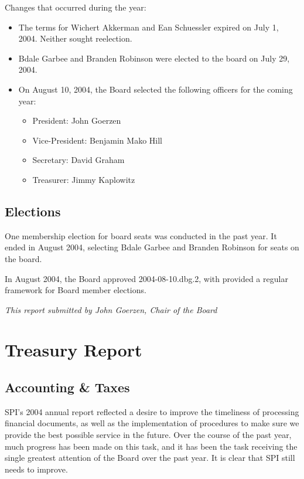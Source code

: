 \documentclass[letterpaper]{report}
\begin{document}
Changes that occurred during the year:

\begin{itemize}

\item The terms for Wichert Akkerman and Ean Schuessler expired on July 1, 2004. Neither sought reelection.
\item Bdale Garbee and Branden Robinson were elected to the board on July 29, 2004.
\item On August 10, 2004, the Board selected the following officers for the coming year:

	\begin{itemize}

	\item President: John Goerzen
	\item Vice-President: Benjamin Mako Hill
	\item Secretary: David Graham
	\item Treasurer: Jimmy Kaplowitz

	\end{itemize}

\end{itemize}

\section{Elections}

One membership election for board seats was conducted in the past year. It
ended in August 2004, selecting Bdale Garbee and Branden Robinson for seats
on the board.

In August 2004, the Board approved 2004-08-10.dbg.2, with provided a
regular framework for Board member elections.

\emph{This report submitted by John Goerzen, Chair of the Board}


\chapter{Treasury Report}

\section{Accounting \& Taxes}

SPI's 2004 annual report reflected a desire to improve the timeliness of
processing financial documents, as well as the implementation of procedures
to make sure we provide the best possible service in the future.  Over the
course of the past year, much progress has been made on this task, and it
has been the task receiving the single greatest attention of the Board over
the past year.  It is clear that SPI still needs to improve.
\end{document}
